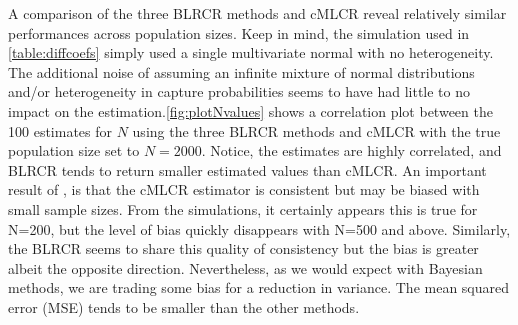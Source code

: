\documentclass[
  12pt,
]{article}
\begin{document}
A comparison of the three BLRCR methods and cMLCR reveal relatively
similar performances across population sizes. Keep in mind, the
simulation used in \autoref{table:diffcoefs} simply used a single
multivariate normal with no heterogeneity. The additional noise of
assuming an infinite mixture of normal distributions and/or
heterogeneity in capture probabilities seems to have had little to no
impact on the estimation.\autoref{fig:plotNvalues} shows a correlation
plot between the 100 estimates for \(N\) using the three BLRCR methods
and cMLCR with the true population size set to \(N=2000\). Notice, the
estimates are highly correlated, and BLRCR tends to return smaller
estimated values than cMLCR. An important result of
\cite{alho_logistic_1990}, is that the cMLCR estimator is consistent but
may be biased with small sample sizes. From the simulations, it
certainly appears this is true for N=200, but the level of bias quickly
disappears with N=500 and above. Similarly, the BLRCR seems to share
this quality of consistency but the bias is greater albeit the opposite
direction. Nevertheless, as we would expect with Bayesian methods, we
are trading some bias for a reduction in variance. The mean squared
error (MSE) tends to be smaller than the other methods.
\end{document}

